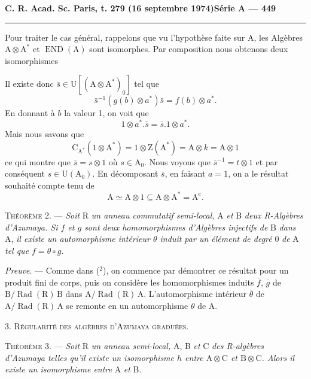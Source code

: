 \textbf{C. R. Acad. Sc. Paris, t. 279 (16 septembre 1974)}\hfill\textbf{Série A — 449}

\rule{\linewidth}{0.4pt}

Pour traiter le cas général, rappelons que vu l'hypothèse faite sur A, les Algèbres $\mathrm A\otimes\mathrm A^*$
et $\operatorname{END}(\mathrm A)$ sont isomorphes. Par composition nous obtenons deux isomorphismes


Il existe donc $\bar s\in\mathrm U[(\mathrm A\otimes\mathrm A^*)_0]$ tel que
\[
\bar s^{-1}(g(b)\otimes a^*)\bar s=f(b)\otimes a^*.
\]
En donnant à $b$ la valeur 1, on voit que
\[
1\otimes a^*.\bar s=\bar s.1\otimes a^*.
\]
Mais nous savons que
\[
\mathrm C_{\mathrm A^*}(1\otimes\mathrm A^*)=1\otimes\mathrm Z(\mathrm A^*)=\mathrm A\otimes k=\mathrm A\otimes1
\]
ce qui montre que $\bar s=s\otimes1$ où $s\in\mathrm A_0$. Nous voyons que $\bar s^{-1}=t\otimes1$ et par conséquent
$s\in\mathrm U(\mathrm A_0)$. En décomposant $\bar s$, en faisant $a=1$, on a le résultat souhaité compte tenu de
\[
\mathrm A\simeq\mathrm A\otimes1\subseteq\mathrm A\otimes\mathrm A^*=\mathrm A^e.
\]

\textsc{Théorème 2}. — \emph{Soit} R \emph{un anneau commutatif semi-local,} A \emph{et} B \emph{deux R-Algèbres d'Azumaya.
Si $f$ et $g$ sont deux homomorphismes d'Algèbres injectifs de} B \emph{dans} A, \emph{il existe un
automorphisme intérieur $\theta$ induit par un élément de degré} 0 \emph{de} A \emph{tel que $f=\theta\circ g$.}

\emph{Preuve}. — Comme dans (${}^2$), on commence par démontrer ce résultat pour un produit
fini de corps, puis on considère les homomorphismes induits $\bar f$, $\bar g$ de $\mathrm B/\operatorname{Rad}(\mathrm R)\,\mathrm B$ dans
$\mathrm A/\operatorname{Rad}(\mathrm R)\,\mathrm A$. L'automorphisme intérieur $\bar\theta$ de $\mathrm A/\operatorname{Rad}(\mathrm R)\,\mathrm A$ se remonte en un automorphisme
$\theta$ de A.

3. \textsc{Régularité des algèbres d'Azumaya graduées}.

\textsc{Théorème 3}. — \emph{Soit} R \emph{un anneau semi-local,} A, B \emph{et} C \emph{des R-algèbres d'Azumaya telles
qu'il existe un isomorphisme $h$ entre $\mathrm A\otimes\mathrm C$ et $\mathrm B\otimes\mathrm C$. Alors il existe un isomorphisme
entre} A \emph{et} B.

